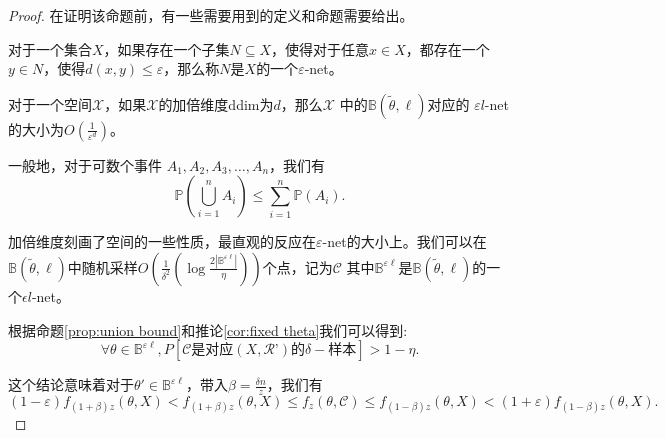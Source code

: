 \begin{proof}
    在证明该命题前，有一些需要用到的定义和命题需要给出。

    \begin{definition}
        对于一个集合$X$，如果存在一个子集$N \subseteq X$，使得对于任意$x \in X$，都存在一个$y \in N$，使得$d(x, y) \leq \varepsilon$，那么称$N$是$X$的一个$\varepsilon$-net。
    \end{definition}

    \begin{proposition}
        对于一个空间$\mathcal{X}$，如果$\mathcal{X}$的加倍维度ddim为$d$，那么$\mathcal{X}$
        中的$\mathbb{B}(\tilde{\theta}, \ell)$对应的
        $\varepsilon l$-net的大小为$O\left(\frac{1}{\varepsilon^d}\right)$。
        \label{prop:net}
    \end{proposition}

    \begin{proposition}
        一般地，对于可数个事件 $A_1, A_2, A_3, \dots ,A_n$，我们有
        \begin{equation*}
            \mathbb{P} \left( \bigcup_{i=1}^{n} A_i \right) \leq \sum_{i=1}^{n} \mathbb{P}(A_i).
        \end{equation*}
        \label{prop:union bound}
    \end{proposition}
    加倍维度刻画了空间的一些性质，最直观的反应在$\varepsilon$-net的大小上。我们可以在
$\mathbb{B}(\tilde{\theta}, \ell)$中随机采样$O\left(\frac{1}{\delta^2}\left(\log \frac{2|\mathbb{B}^{\varepsilon \ell}|}{\eta}\right)\right)$个点，记为$\mathcal{C}$
其中$\mathbb{B}^{\varepsilon \ell}$是$\mathbb{B}(\tilde{\theta}, \ell)$的一个$\epsilon l$-net。

根据命题\ref{prop:union bound}和推论\ref{cor:fixed theta}我们可以得到:
\begin{equation}
    \forall \theta \in \mathbb{B}^{\varepsilon \ell}, P\left[\mathcal{C}\text{是对应}(X,\mathcal{R}’)\text{的}\delta-\text{样本}\right]>1-\eta.
\end{equation}

这个结论意味着对于$\theta' \in \mathbb{B}^{\varepsilon\ell}$，带入$\beta = \frac{\delta n }{z}$，我们有
\begin{equation*}
    (1-\varepsilon)f_{(1+\beta )z}(\theta, X) <
    f_{(1+\beta )z}(\theta, X) \leq 
    f_z(\theta, \mathcal{C}) \leq f_{(1-\beta)z}(\theta, X) <
    (1+\varepsilon)f_{(1-\beta)z}(\theta, X).
\end{equation*}


\end{proof}
